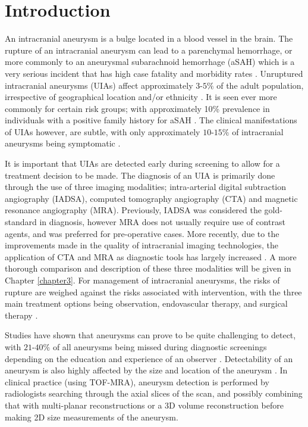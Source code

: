 \chapter{Introduction}
\label{chapter1}

An intracranial aneurysm is a bulge located in a blood vessel in the brain. The rupture of an intracranial aneurysm can lead to a parenchymal hemorrhage, or more commonly to an aneurysmal subarachnoid hemorrhage (aSAH) which is a very serious incident that has high case fatality and morbidity rates \cite{Keedy2006}. Unruptured intracranial aneurysms (UIAs) affect approximately $3$-$5 \%$ of the adult population, irrespective of geographical location and/or ethnicity \cite{vlak2011prevalence}. It is seen ever more commonly for certain risk groups; with approximately 10\% prevalence in individuals with a positive family history for aSAH \cite{bor2014long}. The clinical manifestations of UIAs however, are subtle, with only approximately $10$-$15\%$ of intracranial aneurysms being symptomatic \cite{friedman2001small}. 

It is important that UIAs are detected early during screening to allow for a treatment decision to be made. The diagnosis of an UIA is primarily done through the use of three imaging modalities; intra-arterial digital subtraction angiography (IADSA), computed tomography angiography (CTA) and magnetic resonance angiography (MRA). Previously, IADSA was considered the gold-standard in diagnosis, however MRA does not usually require use of contrast agents, and was preferred for pre-operative cases. More recently, due to the improvements made in the quality of intracranial imaging technologies, the application of CTA and MRA as diagnostic tools has largely increased \cite{Brown2014}. A more thorough comparison and description of these three modalities will be given in Chapter \ref{chapter3}. For management of intracranial aneurysms, the risks of rupture are weighed against the risks associated with intervention, with the three main treatment options being observation, endovascular therapy, and surgical therapy \cite{Keedy2006}. 

Studies have shown that aneurysms can prove to be quite challenging to detect, with $21$-$40\%$ of all aneurysms being missed during diagnostic screenings depending on the education and experience of an observer . Detectability of an aneurysm is also highly affected by the size and location of the aneurysm \cite{okahara2002diagnostic}. In clinical practice (using TOF-MRA), aneurysm detection is performed by radiologists searching through the axial slices of the scan, and possibly combining that with multi-planar reconstructions or a 3D volume reconstruction before making 2D size measurements of the aneurysm. 

